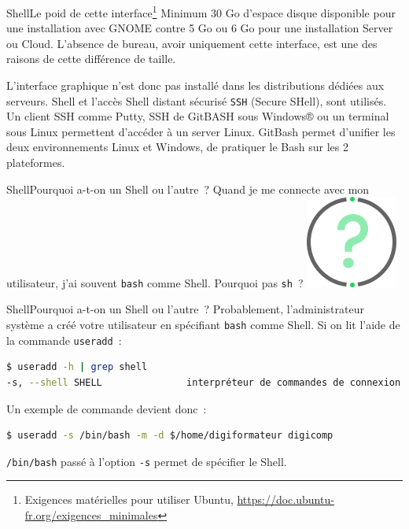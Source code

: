 \documentclass{beamer}
\begin{document}
    \begin{frame}{Shell}{Le poid de cette interface\footnote{Exigences matérielles pour utiliser Ubuntu, \url{https://doc.ubuntu-fr.org/exigences_minimales}}}
        Minimum 30 Go d'espace disque disponible pour une installation avec GNOME contre 5 Go ou 6 Go pour une installation Server ou Cloud.
        \bigbreak
        L'absence de bureau, avoir uniquement cette interface, est une des raisons de cette différence de taille.

        L'interface graphique n'est donc pas installé dans les distributions dédiées aux serveurs.
        Shell et l'accès Shell distant sécurisé \lstinline{SSH} (Secure SHell), sont utilisés.
        Un client SSH comme Putty, SSH de GitBASH sous Windows® ou un terminal sous Linux permettent d'accéder à un server Linux.
        \bigbreak
        GitBash permet d'unifier les deux environnements Linux et Windows, de pratiquer le Bash sur les 2 plateformes.
    \end{frame}

    \begin{frame}{Shell}{Pourquoi a-t-on un Shell ou l'autre~?}
        Quand je me connecte avec mon utilisateur, j'ai souvent \lstinline{bash} comme Shell.
        Pourquoi pas \lstinline{sh}~?
        \bigbreak
        \centering
        \includegraphics[width=3cm]{image/question-mark}
    \end{frame}

    \begin{frame}[fragile]{Shell}{Pourquoi a-t-on un Shell ou l'autre~?}
        Probablement, l'administrateur système a créé votre utilisateur en spécifiant \lstinline{bash} comme Shell.
        \bigbreak
        Si on lit l'aide de la commande \lstinline{useradd}~:
        \begin{lstlisting}[language=bash]
$ useradd -h | grep shell
-s, --shell SHELL               interpréteur de commandes de connexion du nouveau compte
        \end{lstlisting}
        \bigbreak
        Un exemple de commande devient donc~:
        \begin{lstlisting}[language=bash]
$ useradd -s /bin/bash -m -d $/home/digiformateur digicomp
        \end{lstlisting}
        \bigbreak
        \lstinline{/bin/bash} passé à l'option \lstinline{-s} permet de spécifier le Shell.
    \end{frame}
\end{document}
